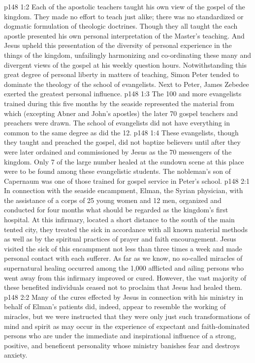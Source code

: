 \vs p148 1:2 Each of the apostolic teachers taught his own view of the gospel of the kingdom. They made no effort to teach just alike; there was no standardized or dogmatic formulation of theologic doctrines. Though they all taught the  each apostle presented his own personal interpretation of the Master’s teaching. And Jesus upheld this presentation of the diversity of personal experience in the things of the kingdom, unfailingly harmonizing and co\hyp{}ordinating these many and divergent views of the gospel at his weekly question hours. Notwithstanding this great degree of personal liberty in matters of teaching, Simon Peter tended to dominate the theology of the school of evangelists. Next to Peter, James Zebedee exerted the greatest personal influence.
\vs p148 1:3 The 100 and more evangelists trained during this five months by the seaside represented the material from which (excepting Abner and John’s apostles) the later 70 gospel teachers and preachers were drawn. The school of evangelists did not have everything in common to the same degree as did the 12.
\vs p148 1:4 These evangelists, though they taught and preached the gospel, did not baptize believers until after they were later ordained and commissioned by Jesus as the 70 messengers of the kingdom. Only 7 of the large number healed at the sundown scene at this place were to be found among these evangelistic students. The nobleman’s son of Capernaum was one of those trained for gospel service in Peter’s school.
\vs p148 2:1 In connection with the seaside encampment, Elman, the Syrian physician, with the assistance of a corps of 25 young women and 12 men, organized and conducted for four months what should be regarded as the kingdom’s first hospital. At this infirmary, located a short distance to the south of the main tented city, they treated the sick in accordance with all known material methods as well as by the spiritual practices of prayer and faith encouragement. Jesus visited the sick of this encampment not less than three times a week and made personal contact with each sufferer. As far as we know, no so\hyp{}called miracles of supernatural healing occurred among the 1,000 afflicted and ailing persons who went away from this infirmary improved or cured. However, the vast majority of these benefited individuals ceased not to proclaim that Jesus had healed them.
\vs p148 2:2 Many of the cures effected by Jesus in connection with his ministry in behalf of Elman’s patients did, indeed, appear to resemble the working of miracles, but we were instructed that they were only just such transformations of mind and spirit as may occur in the experience of expectant and faith\hyp{}dominated persons who are under the immediate and inspirational influence of a strong, positive, and beneficent personality whose ministry banishes fear and destroys anxiety.
